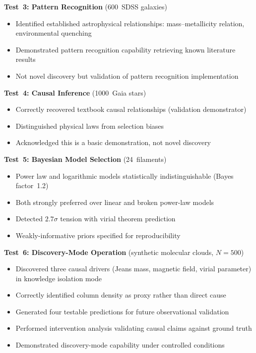 \documentclass[usenatbib]{rasti}
\begin{document}
\textbf{Test~3: Pattern Recognition} (600~SDSS galaxies)
\begin{itemize}
  \item Identified established astrophysical relationships: mass--metallicity relation, environmental quenching
  \item Demonstrated pattern recognition capability retrieving known literature results
  \item Not novel discovery but validation of pattern recognition implementation
\end{itemize}

\textbf{Test~4: Causal Inference} (1000~Gaia stars)
\begin{itemize}
  \item Correctly recovered textbook causal relationships (validation demonstrator)
  \item Distinguished physical laws from selection biases
  \item Acknowledged this is a basic demonstration, not novel discovery
\end{itemize}

\textbf{Test~5: Bayesian Model Selection} (24~filaments)
\begin{itemize}
  \item Power law and logarithmic models statistically indistinguishable (Bayes factor~1.2)
  \item Both strongly preferred over linear and broken power-law models
  \item Detected $2.7\sigma$ tension with virial theorem prediction
  \item Weakly-informative priors specified for reproducibility
\end{itemize}

\textbf{Test~6: Discovery-Mode Operation} (synthetic molecular clouds, $N = 500$)
\begin{itemize}
  \item Discovered three causal drivers (Jeans mass, magnetic field, virial parameter) in knowledge isolation mode
  \item Correctly identified column density as proxy rather than direct cause
  \item Generated four testable predictions for future observational validation
  \item Performed intervention analysis validating causal claims against ground truth
  \item Demonstrated discovery-mode capability under controlled conditions
\end{itemize}
\end{document}
